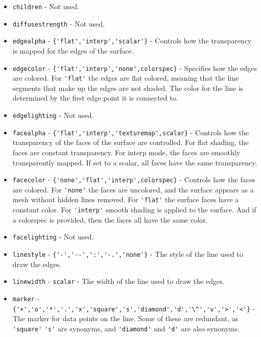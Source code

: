 \begin{itemize}
\item  \verb|children| - Not used.

\item  \verb|diffusestrength| - Not used.

\item  \verb|edgealpha| - \verb|{'flat','interp','scalar'}| - Controls how the
 transparency is mapped for the edges of the surface.

\item  \verb|edgecolor| - \verb|{'flat','interp','none',colorspec}| - Specifies
 how the edges are colored.  For \verb|'flat'| the edges are flat colored,
 meaning that the line segments that make up the edges are not shaded.
 The color for the line is determined by the first edge point it is connected
 to.

\item  \verb|edgelighting| - Not used.

\item  \verb|facealpha| - \verb|{'flat','interp','texturemap',scalar}| - Controls
 how the transparency of the faces of the surface are controlled.  For
 flat shading, the faces are constant transparency.  For interp mode, the faces
 are smoothly transparently mapped.  If set to a scalar, all faces have the
 same transparency.

\item  \verb|facecolor| - \verb|{'none','flat','interp',colorspec}| - Controls
 how the faces are colored.  For \verb|'none'| the faces are uncolored, and
 the surface appears as a mesh without hidden lines removed.  For \verb|'flat'|
 the surface faces have a constant color.  For \verb|'interp'| smooth shading
 is applied to the surface.  And if a colorspec is provided, then the
 faces all have the same color.

\item  \verb|facelighting| - Not used.

\item  \verb|linestyle| - \verb|{'-','--',':','-.','none'}| - The style of the line used
 to draw the edges.

\item  \verb|linewidth| - \verb|scalar| - The width of the line used to draw the edges.

\item  \verb|marker| - \verb|{'+','o','*','.','x','square','s','diamond','d','\^','v','>','<'}| - 
 The marker for data points on the line.  Some of these are redundant, as \verb|'square'| 
 \verb|'s'| are synonyms, and \verb|'diamond'| and \verb|'d'| are also synonyms.


\end{itemize}
